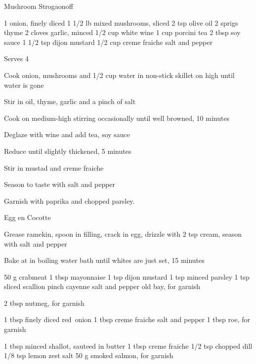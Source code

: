 \begin{denserecipe}{Mushroom Strogaonoff}{}
\begin{ingredients}
1 onion, finely diced
1 1/2 lb mixed mushrooms, sliced
2 tsp olive oil
2 sprigs thyme
2 cloves garlic, minced
1/2 cup white wine
1 cup porcini tea
2 tbsp soy sauce
1 1/2 tsp dijon mustard
1/2 cup creme fraiche
salt and pepper
\end{ingredients}
\nextcolumn
Serves 4
\begin{steps}
    \item Cook onion, mushrooms and 1/2 cup water in non-stick skillet on high until water is gone
    \item Stir in oil, thyme, garlic and a pinch of salt
    \item Cook on medium-high stirring occasionally until well browned, 10 minutes
    \item Deglaze with wine and add tea, soy sauce
    \item Reduce until slightly thickened, 5 minutes
    \item Stir in mustad and creme fraiche
    \item Season to taste with salt and pepper
\end{steps}
Garnish with paprika and chopped parsley.
\end{denserecipe}

\begin{densecard}{Egg en Cocotte}{}
\begin{densesteps}
    \item Grease ramekin, spoon in filling, crack in egg, drizzle with 2 tsp cream, season with salt and pepper
    \item Bake at  in boiling water bath until whites are just set, 15 minutes
\end{densesteps}
\begin{paracol}{3}

\begin{ingredients}
50 g crabmeat
1 tbsp mayonnaise
1 tsp dijon mustard
1 tsp minced parsley
1 tsp sliced scallion
pinch cayenne
salt and pepper
old bay, for garnish
\end{ingredients}
\nextcolumn
{}

\begin{ingredients}
2 tbsp 
nutmeg, for garnish
\end{ingredients}


\begin{ingredients}
1 tbsp finely diced red~onion
1 tbsp creme fraiche
salt and pepper
1 tbsp roe, for garnish
\end{ingredients}
\nextcolumn
{}

\begin{ingredients}
1 tbsp minced shallot, sauteed in butter
1 tbsp creme fraiche
1/2 tsp chopped dill
1/8 tsp lemon zest
salt
50 g smoked salmon, for garnish
\end{ingredients}
\end{paracol}
\end{densecard}

